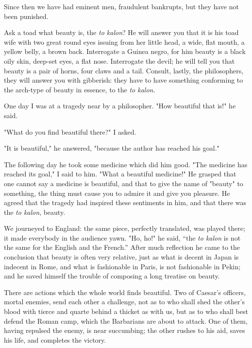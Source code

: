 Since then we have had eminent men, fraudulent bankrupts, but they have
not been punished.






Ask a toad what beauty is, the \textit{to kalon}? He will answer you that it is
his toad wife with two great round eyes issuing from her little head, a
wide, flat mouth, a yellow belly, a brown back. Interrogate a Guinea
negro, for him beauty is a black oily skin, deep-set eyes, a flat nose.
Interrogate the devil; he will tell you that beauty is a pair of horns,
four claws and a tail. Consult, lastly, the philosophers, they will
answer you with gibberish: they have to have something conforming to the
arch-type of beauty in essence, to the \textit{to kalon}.

One day I was at a tragedy near by a philosopher. "How beautiful that
is!" he said.

"What do you find beautiful there?" I asked.

"It is beautiful," he answered, "because the author has reached his
goal."

The following day he took some medicine which did him good. "The
medicine has reached its goal," I said to him. "What a beautiful
medicine!" He grasped that one cannot say a medicine is beautiful, and
that to give the name of "beauty" to something, the thing must cause you
to admire it and give you pleasure. He agreed that the tragedy had
inspired these sentiments in him, and that there was the \textit{to kalon}, beauty.

We journeyed to England: the same piece, perfectly translated, was
played there; it made everybody in the audience yawn. "Ho, ho!" he said,
\enquote{the \textit{to kalon} is not the same for the English and the French.} After
much reflection he came to the conclusion that beauty is often very
relative, just as what is decent in Japan is indecent in Rome, and what
is fashionable in Paris, is not fashionable in Pekin; and he saved
himself the trouble of composing a long treatise on beauty.

There are actions which the whole world finds beautiful. Two of Caesar's
officers, mortal enemies, send each other a challenge, not as to who
shall shed the other's blood with tierce and quarte behind a thicket as
with us, but as to who shall best defend the Roman camp, which the
Barbarians are about to attack. One of them, having repulsed the enemy,
is near succumbing; the other rushes to his aid, saves his life, and
completes the victory.

